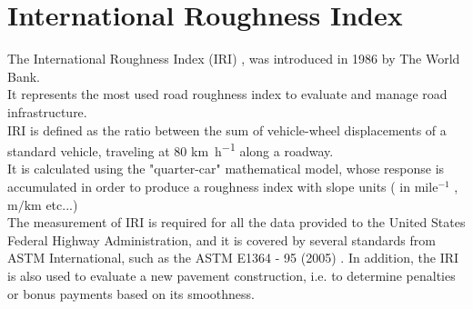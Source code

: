 \documentclass{standalone}
\begin{document}
	\chapter{International Roughness Index}
\label{IRI}
The International Roughness Index (IRI) \cite{sayers1986guidelines}, was introduced in 1986 by The World Bank.\cite{sayers1986guidelines}\cite{sayers1986international}\\It represents the most used road roughness index to evaluate and manage road infrastructure. \\IRI is defined as the ratio between the sum of vehicle-wheel displacements of a standard vehicle, traveling at \num{80} \si{\km\per\hour} along a roadway\cite{sayers1995calculation}. \\It is calculated using the "quarter-car" mathematical model, whose response is accumulated in order to produce a roughness index with slope units ( in  mile$^{-1}$ , $\si{\meter\per\km}$  etc...) \cite{little_book}\\
The measurement of IRI is required for all the data provided to the United States Federal Highway Administration, and it is covered by several standards from ASTM International, such as the ASTM E1364 - 95 (2005) \cite{astm2}. In addition, the IRI is also used to evaluate a new pavement construction, i.e. to determine penalties or bonus payments based on its smoothness.
\end{document}
